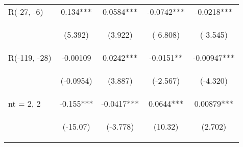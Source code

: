 \documentclass[]{article}
\begin{document}
\begin{center}
\begin{tabular}{lcccc}
        R(-27, -6)       & 0.134***                                        & 0.0584***                                      & -0.0742***                                     & -0.0218***                                     \\
        \vspace{4pt}     & \begin{footnotesize}(5.392)\end{footnotesize}   & \begin{footnotesize}(3.922)\end{footnotesize}  & \begin{footnotesize}(-6.808)\end{footnotesize} & \begin{footnotesize}(-3.545)\end{footnotesize} \\
        R(-119, -28)     & -0.00109                                        & 0.0242***                                      & -0.0151**                                      & -0.00947***                                    \\
        \vspace{4pt}     & \begin{footnotesize}(-0.0954)\end{footnotesize} & \begin{footnotesize}(3.887)\end{footnotesize}  & \begin{footnotesize}(-2.567)\end{footnotesize} & \begin{footnotesize}(-4.320)\end{footnotesize} \\
        nt = 2, 2        & -0.155***                                       & -0.0417***                                     & 0.0644***                                      & 0.00879***                                     \\
        \vspace{4pt}     & \begin{footnotesize}(-15.07)\end{footnotesize}  & \begin{footnotesize}(-3.778)\end{footnotesize} & \begin{footnotesize}(10.32)\end{footnotesize}  & \begin{footnotesize}(2.702)\end{footnotesize}  \\

\end{tabular}
\end{center}
\end{document}
